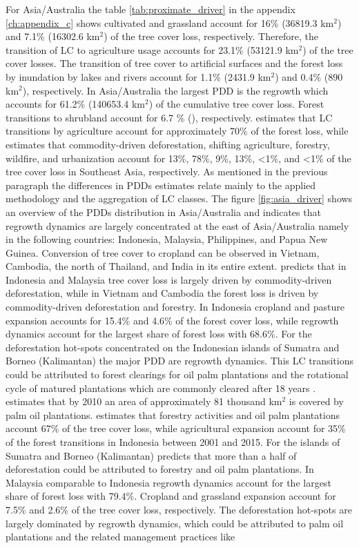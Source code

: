 			For Asia/Australia the table \ref{tab:proximate_driver} in the appendix \ref{ch:appendix_c} shows cultivated and grassland account for 16\% (36819.3 km$^2$) and 7.1\% (16302.6 km$^2$) of the tree cover loss, respectively. Therefore, the transition of \ac{LC} to agriculture usage accounts for 23.1\% (53121.9 km$^2$) of the tree cover losses. The transition of tree cover to artificial surfaces and the forest loss by inundation by lakes and rivers account for 1.1\% (2431.9 km$^2$) and 0.4\% (890 km$^2$), respectively. In Asia/Australia the largest \ac{PDD} is the regrowth which accounts for 61.2\% (140653.4 km$^2$) of the cumulative tree cover loss. Forest transitions to shrubland account for 6.7 \% (), respectively. \citet{Hosonuma2012} estimates that \ac{LC} transitions by agriculture account for approximately 70\% of the forest loss, while \citet{Curtis2018} estimates that commodity-driven deforestation, shifting agriculture, forestry, wildfire, and urbanization account for 13\%, 78\%, 9\%, 13\%, <1\%, and <1\% of the tree cover loss in Southeast Asia, respectively. As mentioned in the previous paragraph the differences in \acp{PDD} estimates relate mainly to the applied methodology and the aggregation of \ac{LC} classes. The figure \ref{fig:asia_driver} shows an overview of the \acp{PDD} distribution in Asia/Australia and indicates that regrowth dynamics are largely concentrated at the east of Asia/Australia namely in the following countries: Indonesia, Malaysia, Philippines, and Papua New Guinea. Conversion of tree cover to cropland can be observed in Vietnam, Cambodia, the north of Thailand, and India in its entire extent. \citeauthor{Curtis2018} predicts that in Indonesia and Malaysia tree cover loss is largely driven by commodity-driven deforestation, while in Vietnam and Cambodia the forest loss is driven by commodity-driven deforestation and forestry. In Indonesia cropland and pasture expansion accounts for 15.4\% and 4.6\% of the forest cover loss, while regrowth dynamics account for the largest share of forest loss with 68.6\%. For the deforestation hot-spots concentrated on the Indonesian islands of Sumatra and Borneo (Kalimantan) the major \ac{PDD} are regrowth dynamics. This \ac{LC} transitions could be attributed to forest clearings for oil palm plantations and the rotational cycle of matured plantations which are commonly cleared after 18 years \citep{Corley2016}. \citeauthor{Corley2016} estimates that by 2010 an area of approximately 81 thousand km$^2$ is covered by palm oil plantations. \citet{Austin2019} estimates that forestry activities and oil palm plantations account 67\% of the tree cover loss, while agricultural expansion account for 35\% of the forest transitions in Indonesia between 2001 and 2015. For the islands of Sumatra and Borneo (Kalimantan) \citeauthor{Austin2019} predicts that more than a half of deforestation could be attributed to forestry and oil palm plantations. In Malaysia comparable to Indonesia regrowth dynamics account for the largest share of forest loss with 79.4\%. Cropland and grassland expansion account for 7.5\% and 2.6\% of the tree cover loss, respectively. The deforestation hot-spots are largely dominated by regrowth dynamics, which could be attributed to palm oil plantations and the related management practices like 